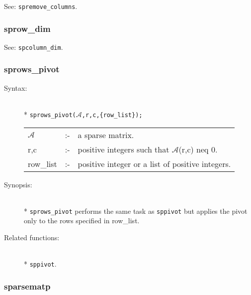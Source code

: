 See: \texttt{spremove\_columns}.


\subsubsection{sprow\_dim}
\label{sparse:sprow_dim}

See: \texttt{spcolumn\_dim}.


\subsubsection{sprows\_pivot}
\label{sparse:sprows_pivot}

\begin{description}
\item[Syntax:]\mbox{}\\*
\texttt{sprows\_pivot($\mathcal{A}$,r,c,\{row\_list\});}\\[2mm]
\begin{tabular}{l l l} 
$\mathcal{A}$ &:-& a sparse matrix. \\
r,c        &:-& positive integers such that $\mathcal{A}$(r,c) neq 0.\\
row\_list  &:-& positive integer or a list of positive integers.
\end{tabular}

\item[Synopsis:]\mbox{}\\*
\texttt{sprows\_pivot} performs the same task as \texttt{sppivot} but applies 
the pivot only to the rows specified in row\_list.

\item[Related functions:]\mbox{}\\*
\texttt{sppivot}.
\end{description}

\subsubsection{sparsematp}
\label{sparse:sparsematp}

